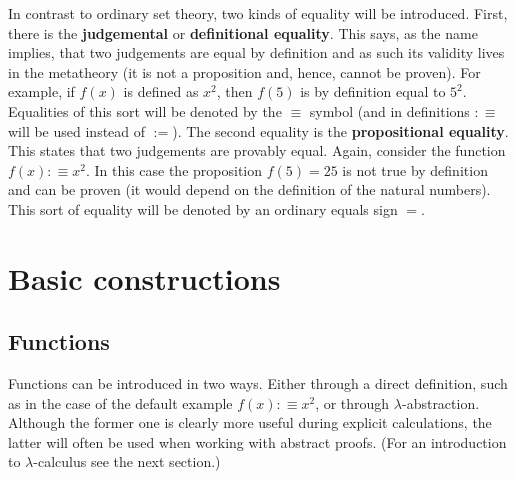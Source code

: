     In contrast to ordinary set theory, two kinds of equality will be introduced. First, there is the \textbf{judgemental} or \textbf{definitional equality}. This says, as the name implies, that two judgements are equal by definition and as such its validity lives in the metatheory (it is not a proposition and, hence, cannot be proven). For example, if $f(x)$ is defined as $x^2$, then $f(5)$ is by definition equal to $5^2$. Equalities of this sort will be denoted by the $\equiv$ symbol (and in definitions $:\equiv$ will be used instead of $:=$). The second equality is the \textbf{propositional equality}. This states that two judgements are provably equal. Again, consider the function $f(x):\equiv x^2$. In this case the proposition $f(5)=25$ is not true by definition and can be proven (it would depend on the definition of the natural numbers). This sort of equality will be denoted by an ordinary equals sign $=$.

\section{Basic constructions}
\subsection{Functions}

    Functions can be introduced in two ways. Either through a direct definition, such as in the case of the default example $f(x):\equiv x^2$, or through $\lambda$-abstraction. Although the former one is clearly more useful during explicit calculations, the latter will often be used when working with abstract proofs. (For an introduction to $\lambda$-calculus see the next section.)

